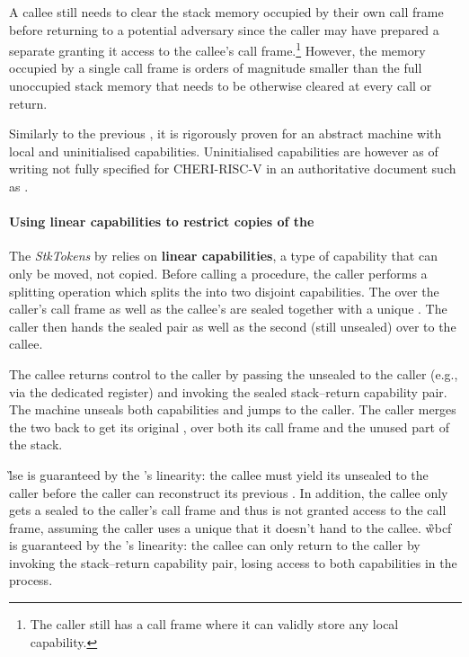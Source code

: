 \documentclass[main.tex]{subfiles}
\begin{document}
A callee still needs to clear the stack memory occupied by their own call frame before returning to a potential adversary since the caller may have prepared a separate  granting it access to the callee's call frame.\footnote{The caller still has a call frame where it can validly store any local capability.} However, the memory occupied by a single call frame is orders of magnitude smaller than the full unoccupied stack memory that needs to be otherwise cleared at every call or return.

Similarly to the previous , it is rigorously proven for an abstract machine with local and uninitialised capabilities. Uninitialised capabilities are however as of writing not fully specified for CHERI-RISC-V in an authoritative document such as \cite{cheri}.

\paragraph{Using linear capabilities to restrict copies of the } The \emph{StkTokens}  by \cite{stktokens} relies on \textbf{linear capabilities}, a type of capability that can only be moved, not copied. Before calling a procedure, the caller performs a splitting operation which splits the  into two disjoint capabilities. The  over the caller's call frame as well as the callee's  are sealed together with a unique . The caller then hands the sealed pair as well as the second (still unsealed)  over to the callee.

The callee returns control to the caller by passing the unsealed  to the caller (e.g., via the dedicated  register) and invoking the sealed stack–return capability pair. The machine unseals both capabilities and jumps to the caller. The caller merges the two  back to get its original , over both its call frame and the unused part of the stack.

\G{lse} is guaranteed by the 's linearity: the callee must yield its unsealed  to the caller before the caller can reconstruct its previous . In addition, the callee only gets a sealed  to the caller's call frame and thus is not granted access to the call frame, assuming the caller uses a unique  that it doesn't hand to the callee. \G{wbcf} is guaranteed by the 's linearity: the callee can only return to the caller by invoking the stack–return capability pair, losing access to both capabilities in the process.
\end{document}
